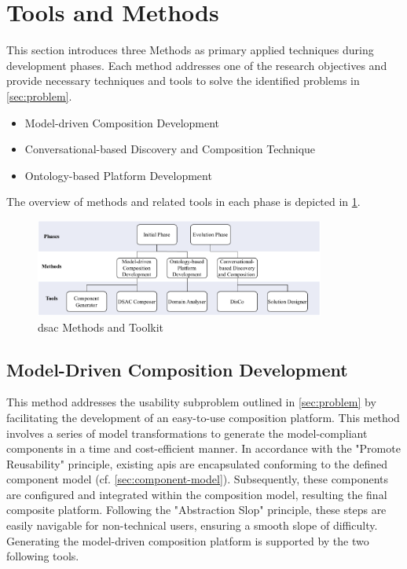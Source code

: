 \vspace{-10pt}
\hypertarget{sec:tools}{%
\section{Tools and Methods}\label{sec:tools}}
\vspace{10pt}

This section introduces three Methods as primary applied techniques during development phases. Each method addresses one of the research objectives and provide necessary techniques and tools to solve the identified problems in \cref{sec:problem}.
\begin{itemize}
  \item
  Model-driven Composition Development
  \item
  Conversational-based Discovery and Composition Technique
  \item
  Ontology-based Platform Development 
  \end{itemize}
The overview of methods and related tools in each phase is depicted in \cref{fig:methods}.

\begin{figure}[hbt]
\hypertarget{fig:methods}{%
\centering
\includegraphics[width=0.85\textwidth]{../figures/MyFigures/Methods.drawio.pdf}
\captionsetup{justification=centering}
\caption{\gls{dsac} Methods and Toolkit}\label{fig:methods}
}
\end{figure}

\vspace{-18pt}
\hypertarget{sec:mdcd}{%
\subsection{Model-Driven Composition Development}\label{sec:mdcd}}
\vspace{4pt}
This method addresses the usability subproblem outlined in \cref{sec:problem} by facilitating the development of an easy-to-use composition platform. This method involves a series of model transformations to generate the model-compliant components in a time and cost-efficient manner. In accordance with the "Promote Reusability" principle, existing \gls{api}s are encapsulated conforming to the defined component model (cf. \cref{sec:component-model}). Subsequently, these components are configured and integrated within the composition model, resulting the final composite platform. Following the "Abstraction Slop" principle, these steps are easily navigable for non-technical users, ensuring a smooth slope of difficulty.
Generating the model-driven composition platform is supported by the two following tools.

